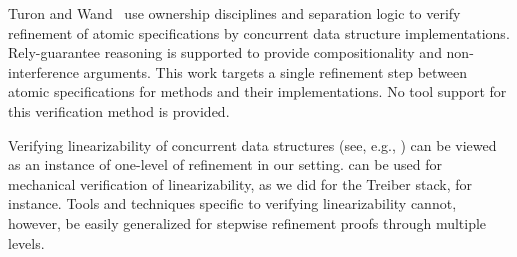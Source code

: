 Turon and Wand~\cite{TuronM11} use ownership disciplines and
separation logic to verify refinement of atomic specifications by 
concurrent data structure implementations. Rely-guarantee reasoning is
supported to provide compositionality and non-interference
arguments. This work targets a single refinement step between atomic
specifications for methods and their implementations. 
No tool support for this verification method is provided. 

Verifying linearizability of concurrent data structures (see, e.g.,
\cite{tacasLin,aliLin}) can be viewed as an instance of one-level of
refinement in our setting. \civl can be used for mechanical
verification of linearizability, as we did for the Treiber stack, for
instance. Tools and techniques specific to verifying linearizability
cannot, however, be easily generalized for stepwise refinement proofs
through multiple levels. 

